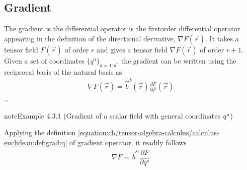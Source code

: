 \documentclass[letterpaper,10pt,english]{jupyterBook}
\begin{document}
\subsection{Gradient}
\label{\detokenize{ch/tensor-algebra-calculus/calculus-euclidean:gradient}}\label{\detokenize{ch/tensor-algebra-calculus/calculus-euclidean:tensor-calculus-differential-operators-gradient}}
\sphinxAtStartPar
The gradient is the differential operator is the first\sphinxhyphen{}order differential operator appearing in the definition of the directional derivative, \(\nabla F(\vec{r})\). It takes a tensor field \(F(\vec{r})\) of order \(r\) and gives a tensor field \(\nabla F(\vec{r})\) of order \(r+1\). Given a set of coordinates \(\{q^a\}_{a=1:d}\), the gradient can be written using the reciprocal basis of the natural basis as
\begin{equation}\label{equation:ch/tensor-algebra-calculus/calculus-euclidean:def:grad:q}
\begin{split}\nabla F(\vec{r}) = \vec{b}^b(\vec{r}) \frac{\partial F}{\partial q^b}(\vec{r})\end{split}
\end{equation}
\sphinxAtStartPar
{} …
\label{ch/tensor-algebra-calculus/calculus-euclidean:example-4}
\begin{sphinxadmonition}{note}{Example 4.3.1 (Gradient of a scalar field \sphinxhyphen{} with general coordinates \protect\(q^{a}\protect\))}



\sphinxAtStartPar
Applying the definition \eqref{equation:ch/tensor-algebra-calculus/calculus-euclidean:def:grad:q} of gradient operator, it readily follows
\begin{equation*}
\begin{split}\nabla F = \vec{b}^a \dfrac{\partial F}{\partial q^a}\end{split}
\end{equation*}\end{sphinxadmonition}
\label{ch/tensor-algebra-calculus/calculus-euclidean:example-5}
\end{document}
